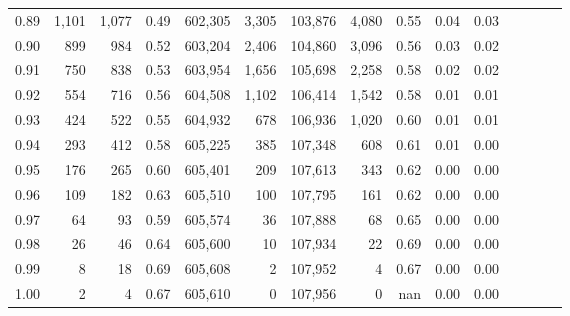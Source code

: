\begin{tabular}{rrrcrrrrrrrrrrr}
0.89 &   1,101 &  1,077 &                                       0.49 &  602,305 &    3,305 &  103,876 &    4,080 &  0.55 &  0.04 &                         0.03 \\
0.90 &     899 &    984 &                                       0.52 &  603,204 &    2,406 &  104,860 &    3,096 &  0.56 &  0.03 &                         0.02 \\
0.91 &     750 &    838 &                                       0.53 &  603,954 &    1,656 &  105,698 &    2,258 &  0.58 &  0.02 &                         0.02 \\
0.92 &     554 &    716 &                                       0.56 &  604,508 &    1,102 &  106,414 &    1,542 &  0.58 &  0.01 &                         0.01 \\
0.93 &     424 &    522 &                                       0.55 &  604,932 &      678 &  106,936 &    1,020 &  0.60 &  0.01 &                         0.01 \\
0.94 &     293 &    412 &                                       0.58 &  605,225 &      385 &  107,348 &      608 &  0.61 &  0.01 &                         0.00 \\
0.95 &     176 &    265 &                                       0.60 &  605,401 &      209 &  107,613 &      343 &  0.62 &  0.00 &                         0.00 \\
0.96 &     109 &    182 &                                       0.63 &  605,510 &      100 &  107,795 &      161 &  0.62 &  0.00 &                         0.00 \\
0.97 &      64 &     93 &                                       0.59 &  605,574 &       36 &  107,888 &       68 &  0.65 &  0.00 &                         0.00 \\
0.98 &      26 &     46 &                                       0.64 &  605,600 &       10 &  107,934 &       22 &  0.69 &  0.00 &                         0.00 \\
0.99 &       8 &     18 &                                       0.69 &  605,608 &        2 &  107,952 &        4 &  0.67 &  0.00 &                         0.00 \\
1.00 &       2 &      4 &                                       0.67 &  605,610 &        0 &  107,956 &        0 &   nan &  0.00 &                         0.00 \\
\bottomrule
\end{tabular}
